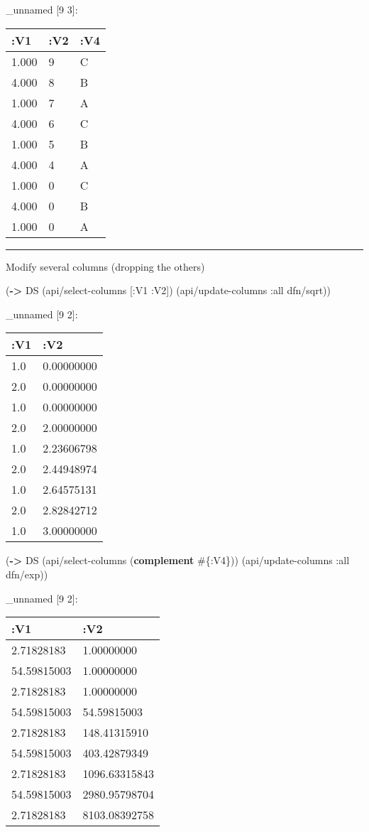 \documentclass[]{article}
\newenvironment{Shaded}{\begin{snugshade}}{\end{snugshade}}
\newcommand{\AttributeTok}[1]{\textcolor[rgb]{0.77,0.63,0.00}{#1}}
\newcommand{\KeywordTok}[1]{\textcolor[rgb]{0.13,0.29,0.53}{\textbf{#1}}}
\newcommand{\NormalTok}[1]{#1}
\begin{document}
\_unnamed {[}9 3{]}:

\begin{longtable}[]{@{}lll@{}}
\toprule
:V1 & :V2 & :V4\tabularnewline
\midrule
\endhead
1.000 & 9 & C\tabularnewline
4.000 & 8 & B\tabularnewline
1.000 & 7 & A\tabularnewline
4.000 & 6 & C\tabularnewline
1.000 & 5 & B\tabularnewline
4.000 & 4 & A\tabularnewline
1.000 & 0 & C\tabularnewline
4.000 & 0 & B\tabularnewline
1.000 & 0 & A\tabularnewline
\bottomrule
\end{longtable}

\begin{center}\rule{0.5\linewidth}{0.5pt}\end{center}

Modify several columns (dropping the others)

\begin{Shaded}
\begin{Highlighting}[]
\NormalTok{(}\KeywordTok{->}\NormalTok{ DS}
\NormalTok{    (api/select-columns [}\AttributeTok{:V1} \AttributeTok{:V2}\NormalTok{])}
\NormalTok{    (api/update-columns }\AttributeTok{:all}\NormalTok{ dfn/sqrt))}
\end{Highlighting}
\end{Shaded}

\_unnamed {[}9 2{]}:

\begin{longtable}[]{@{}ll@{}}
\toprule
:V1 & :V2\tabularnewline
\midrule
\endhead
1.0 & 0.00000000\tabularnewline
2.0 & 0.00000000\tabularnewline
1.0 & 0.00000000\tabularnewline
2.0 & 2.00000000\tabularnewline
1.0 & 2.23606798\tabularnewline
2.0 & 2.44948974\tabularnewline
1.0 & 2.64575131\tabularnewline
2.0 & 2.82842712\tabularnewline
1.0 & 3.00000000\tabularnewline
\bottomrule
\end{longtable}

\begin{Shaded}
\begin{Highlighting}[]
\NormalTok{(}\KeywordTok{->}\NormalTok{ DS}
\NormalTok{    (api/select-columns (}\KeywordTok{complement}\NormalTok{ #\{}\AttributeTok{:V4}\NormalTok{\}))}
\NormalTok{    (api/update-columns }\AttributeTok{:all}\NormalTok{ dfn/exp))}
\end{Highlighting}
\end{Shaded}

\_unnamed {[}9 2{]}:

\begin{longtable}[]{@{}ll@{}}
\toprule
:V1 & :V2\tabularnewline
\midrule
\endhead
2.71828183 & 1.00000000\tabularnewline
54.59815003 & 1.00000000\tabularnewline
2.71828183 & 1.00000000\tabularnewline
54.59815003 & 54.59815003\tabularnewline
2.71828183 & 148.41315910\tabularnewline
54.59815003 & 403.42879349\tabularnewline
2.71828183 & 1096.63315843\tabularnewline
54.59815003 & 2980.95798704\tabularnewline
2.71828183 & 8103.08392758\tabularnewline
\bottomrule
\end{longtable}
\end{document}
